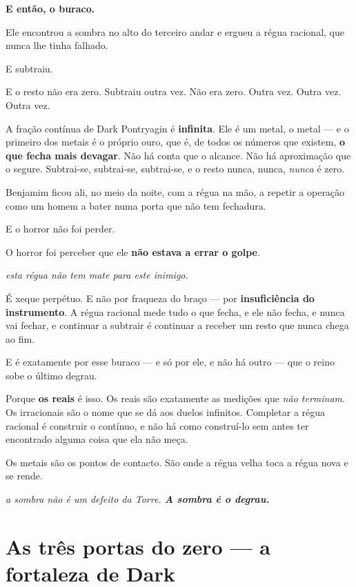 \documentclass[livro.tex]{subfiles}
\begin{document}
\medskip\noindent\textbf{E então, o buraco.}

Ele encontrou a sombra no alto do terceiro andar e ergueu a régua racional, que nunca lhe tinha falhado.

E subtraiu.

E o resto não era zero. Subtraiu outra vez. Não era zero. Outra vez. Outra vez. Outra vez.

A fração contínua de Dark Pontryagin é \textbf{infinita}. Ele é um metal, o metal --- e o primeiro dos metais é o
próprio ouro, que é, de todos os números que existem, \textbf{o que fecha mais devagar}. Não há
conta que o alcance. Não há aproximação que o segure. Subtrai-se, subtrai-se, subtrai-se, e o resto nunca,
nunca, \emph{nunca} é zero.

Benjamim ficou ali, no meio da noite, com a régua na mão, a repetir a operação como um homem a bater numa porta que
não tem fechadura.

E o horror não foi perder.

O horror foi perceber que ele \textbf{não estava a errar o golpe}.

\begin{center}\itshape
esta régua não tem mate para este inimigo.
\end{center}

É xeque perpétuo. E não por fraqueza do braço --- por \textbf{insuficiência do instrumento}. A régua racional mede
tudo o que fecha, e ele não fecha, e nunca vai fechar, e continuar a subtrair é continuar a receber um resto que
nunca chega ao fim.

\medskip

E é exatamente por esse buraco --- e só por ele, e não há outro --- que o reino sobe o último degrau.

Porque \textbf{os reais} é isso. Os reais são exatamente as medições que \emph{não terminam}. Os irracionais são o nome
que se dá aos duelos infinitos. Completar a régua racional é construir o contínuo, e não há como construí-lo sem
antes ter encontrado alguma coisa que ela não meça.

Os metais são os pontos de contacto. São onde a régua velha toca a régua nova e se rende.

\begin{center}\itshape
a sombra não é um defeito da Torre. \textbf{A sombra é o degrau.}
\end{center}


\chapter{As três portas do zero --- a fortaleza de Dark}
\end{document}
